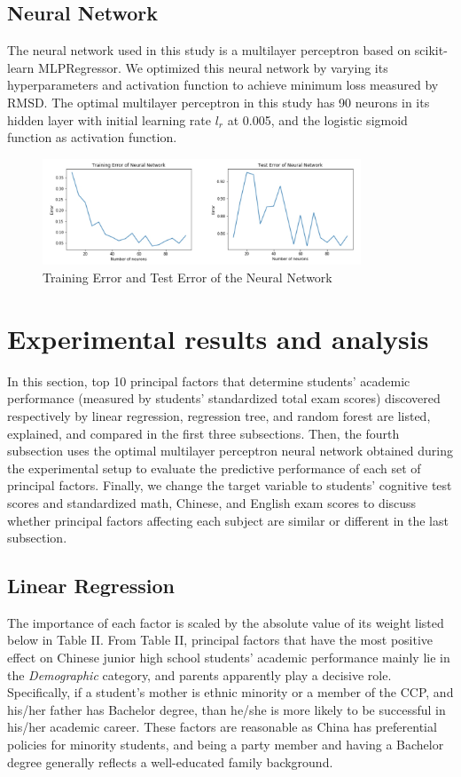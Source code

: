 \documentclass[conference]{IEEEtran}
\begin{document}
\subsection{Neural Network}
The neural network used in this study is a multilayer perceptron based on scikit-learn MLPRegressor. We optimized this neural network by varying its hyperparameters and activation function to achieve minimum loss measured by RMSD. The optimal multilayer perceptron in this study has 90 neurons in its hidden layer with initial learning rate $l_r$ at 0.005, and the logistic sigmoid function as activation function.
\begin{figure}[htbp]
\centerline{\includegraphics[width=9.5cm]{nn_error.jpg}}
\caption{Training Error and Test Error of the Neural Network}
\label{fig}
\end{figure}
\section{Experimental results and analysis}
In this section, top 10 principal factors that determine students' academic performance (measured by students’ standardized total exam scores) discovered respectively by linear regression, regression tree, and random forest are listed, explained, and compared in the first three subsections. Then, the fourth subsection uses the optimal multilayer perceptron neural network obtained during the experimental setup to evaluate the predictive performance of each set of principal factors. Finally, we change the target variable to students' cognitive test scores and standardized math, Chinese, and English exam scores to discuss whether principal factors affecting each subject are similar or different in the last subsection.
\subsection{Linear Regression}
The importance of each factor is scaled by the absolute value of its weight listed below in Table II. From Table II, principal factors that have the most positive effect on Chinese junior high school students' academic performance mainly lie in the \textit{Demographic} category, and parents apparently play a decisive role. Specifically, if a student's mother is ethnic minority or a member of the CCP, and his/her father has Bachelor degree, than he/she is more likely to be successful in his/her academic career. These factors are reasonable as China has preferential policies for minority students, and being a party member and having a Bachelor degree generally reflects a well-educated family background.
\end{document}
